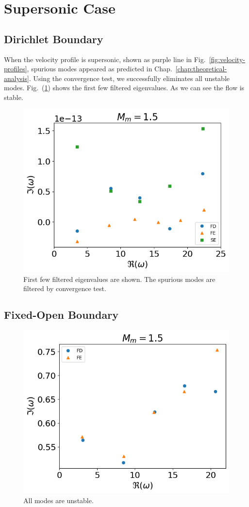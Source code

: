 \section{Supersonic Case}
\subsection{Dirichlet Boundary}
When the velocity profile is supersonic, shown as purple line in Fig.~\ref{fig:velocity-profiles}, spurious modes appeared as predicted in Chap.~\ref{chap:theoretical-analysis}. Using the convergence test, we successfully eliminates all unstable modes. Fig.~(\ref{fig:supersonic-v-dirichlet}) shows the first few filtered eigenvalues. As we can see the flow is stable.
\begin{figure} [H]
	\centering
	\includegraphics[width=0.7\linewidth]{figures/fixed-fixed-supersonic-v}
	\caption{First few filtered eigenvalues are shown. The spurious modes are filtered by convergence test.}
	\label{fig:supersonic-v-dirichlet}
\end{figure}

\subsection{Fixed-Open Boundary}
\begin{figure} [H]
	\centering
	\includegraphics[width=0.7\linewidth]{figures/fixed-open-supersonic-v}
	\caption{All modes are unstable.}
	\label{fig:supersonic-v-fixed-open}
\end{figure}


